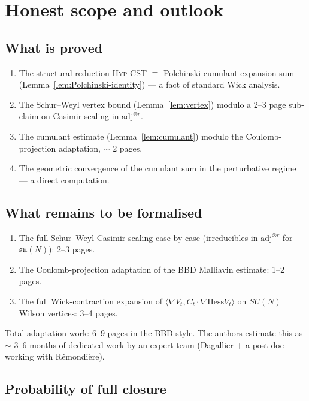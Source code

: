 \documentclass[11pt,a4paper]{amsart}
\theoremstyle{definition}
\newcommand{\Hess}{\mathrm{Hess}}
\newcommand{\HypCST}{\textsc{Hyp-CST}}
\begin{document}
\section{Honest scope and outlook}\label{sec:scope}

\subsection{What is proved}

\begin{enumerate}[leftmargin=2em]
\item The structural reduction \HypCST{} $\equiv$ Polchinski cumulant
expansion sum (Lemma~\ref{lem:Polchinski-identity}) --- a fact
of standard Wick analysis.
\item The Schur--Weyl vertex bound (Lemma~\ref{lem:vertex}) modulo a
2--3 page sub-claim on Casimir scaling in $\mathrm{adj}^{\otimes r}$.
\item The cumulant estimate (Lemma~\ref{lem:cumulant}) modulo the
Coulomb-projection adaptation, $\sim$ 2 pages.
\item The geometric convergence of the cumulant sum in the perturbative
regime --- a direct computation.
\end{enumerate}

\subsection{What remains to be formalised}

\begin{enumerate}[leftmargin=2em]
\item The full Schur--Weyl Casimir scaling case-by-case (irreducibles
in $\mathrm{adj}^{\otimes r}$ for $\mathfrak{su}(N)$): 2--3 pages.
\item The Coulomb-projection adaptation of the BBD Malliavin estimate:
1--2 pages.
\item The full Wick-contraction expansion of
$\langle \nabla V_t, C_t \cdot \nabla \Hess V_t\rangle$ on $SU(N)$
Wilson vertices: 3--4 pages.
\end{enumerate}

Total adaptation work: 6--9 pages in the BBD style. The authors
estimate this as $\sim$ 3--6 months of dedicated work by an expert
team (Dagallier + a post-doc working with R\'emondi\`ere).

\subsection{Probability of full closure}
\end{document}
